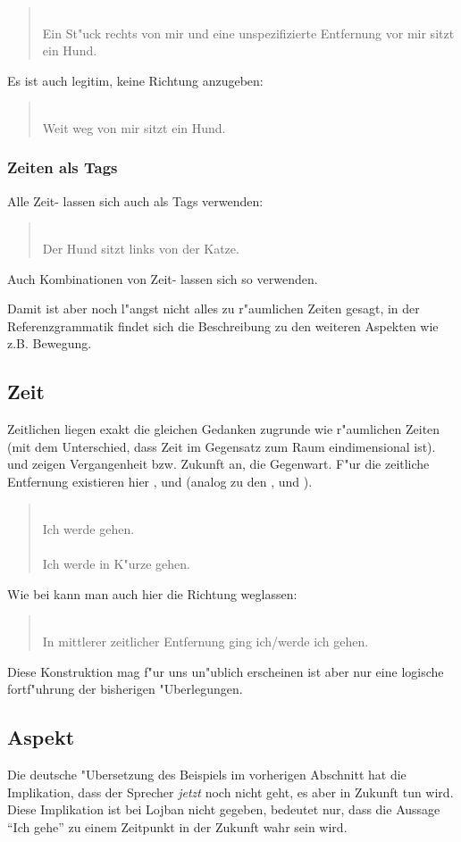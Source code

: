 \begin{quote}
 \\
Ein St"uck rechts von mir und eine unspezifizierte Entfernung vor mir sitzt ein Hund.
\end{quote}

Es ist auch legitim, keine Richtung anzugeben:
\begin{quote}
 \\
Weit weg von mir sitzt ein Hund.
\end{quote}

\subsubsection{Zeiten als Tags}
Alle Zeit- lassen sich auch als Tags verwenden:
\begin{quote}
 \\
Der Hund sitzt links von der Katze.
\end{quote}
Auch Kombinationen von Zeit- lassen sich so verwenden.

Damit ist aber noch l"angst nicht alles zu r"aumlichen Zeiten gesagt, in der Referenzgrammatik findet sich die Beschreibung zu den weiteren
Aspekten wie z.B. Bewegung.

\subsection{Zeit}
Zeitlichen  liegen exakt die gleichen Gedanken zugrunde wie r"aumlichen Zeiten (mit dem Unterschied, dass Zeit im Gegensatz zum
Raum eindimensional ist).  und  zeigen Vergangenheit bzw. Zukunft an,  die Gegenwart. F"ur die zeitliche Entfernung existieren 
hier ,  und  (analog zu den  ,  und ).
\begin{quote}
 \\
Ich werde gehen. \\
 \\
Ich werde in K"urze gehen.
\end{quote}

Wie bei  kann man auch hier die Richtung weglassen:
\begin{quote}
 \\
In mittlerer zeitlicher Entfernung ging ich/werde ich gehen.
\end{quote}
Diese Konstruktion mag f"ur uns un"ublich erscheinen ist aber nur eine logische fortf"uhrung der bisherigen "Uberlegungen.

\subsection{Aspekt}
Die deutsche "Ubersetzung des Beispiels  im vorherigen Abschnitt hat die Implikation, dass der Sprecher \emph{jetzt} noch nicht geht, es
aber in Zukunft tun wird. Diese Implikation ist bei Lojban nicht gegeben,  bedeutet nur, dass die Aussage ``Ich gehe'' zu einem
Zeitpunkt in der Zukunft wahr sein wird.
